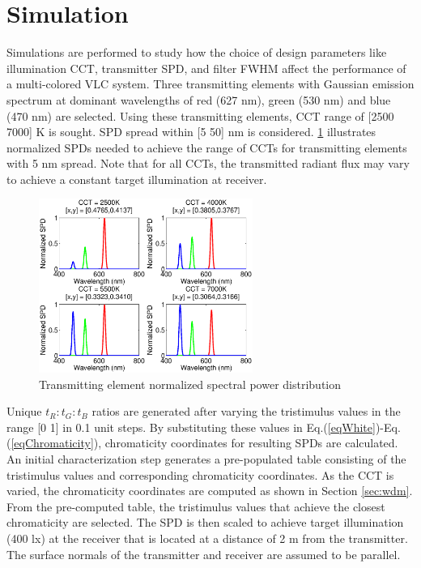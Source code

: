 \section{Simulation}\label{sec:simulation}
Simulations are performed to study how the choice of design parameters like illumination CCT, transmitter SPD, and filter FWHM affect the performance of a multi-colored VLC system. Three transmitting elements with Gaussian emission spectrum at dominant wavelengths of red (627 nm), green (530 nm) and blue (470 nm) are selected. Using these transmitting elements, CCT range of [2500 7000] K is sought. SPD spread within [5 50] nm is considered. \figurename{\ref{fig:LEDSPD}} illustrates normalized SPDs needed to achieve the range of CCTs for transmitting elements with 5 nm spread. Note that for all CCTs, the transmitted radiant flux may vary to achieve a constant target illumination at receiver. 

\begin{figure}[!b]
	\centering
		\includegraphics[trim={0.05in 0.05in 0.05in 0.0in}, clip=true, width=2.75in]{img/LEDSPD.eps}
	\caption{Transmitting element normalized spectral power distribution}
	\label{fig:LEDSPD}
\end{figure}

Unique $t_R:t_G:t_B$ ratios are generated after varying the tristimulus values in the range [0 1] in 0.1 unit steps. By substituting these values in Eq.(\ref{eqWhite})-Eq.(\ref{eqChromaticity}), chromaticity coordinates for resulting SPDs are calculated. An initial characterization step generates a pre-populated table consisting of the tristimulus values and corresponding chromaticity coordinates. As the CCT is varied, the chromaticity coordinates are computed as shown in Section \ref{sec:wdm}. From the pre-computed table, the tristimulus values that achieve the closest chromaticity are selected. The SPD is then scaled to achieve target illumination (400 lx) at the receiver that is located at a distance of 2 m from the transmitter. The surface normals of the transmitter and receiver are assumed to be parallel.

